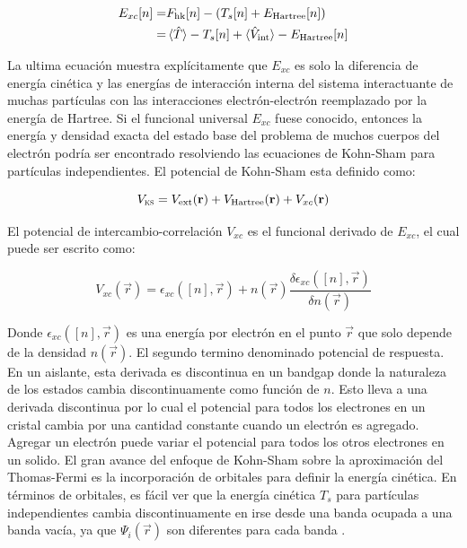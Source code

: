 \begin{equation}
    \begin{split}
        E_{xc}[n]=&F_{\text{hk}}[n]-(T_{s}[n]+E_{\text{Hartree}}[n])\\
        =&\braket{\hat{T}}-T_{s}[n]+\braket{\hat{V}_{\text{int}}}-E_{\text{Hartree}}[n]
    \end{split}
\end{equation}

La ultima ecuación muestra explícitamente que $E_{xc}$ es solo la diferencia de energía cinética y las energías de interacción interna del sistema interactuante de muchas partículas con las interacciones electrón-electrón reemplazado por la energía de Hartree. Si el funcional universal $E_{xc}$ fuese conocido, entonces la energía y densidad exacta del estado base del problema de muchos cuerpos del electrón podría ser encontrado resolviendo las ecuaciones de Kohn-Sham para partículas independientes. El potencial de Kohn-Sham esta definido como:

\begin{equation}
    V_{\textsc{ks}}=V_{\text{ext}}(\vec{r})+V_{\text{Hartree}}(\vec{r})+V_{xc}(\vec{r})
    \label{Eq. V_ks}
\end{equation}  

El potencial de intercambio-correlación $V_{xc}$ es el funcional derivado de $E_{xc}$, el cual puede ser escrito como:


\begin{equation}
    V_{xc}(\vec{r})=\epsilon_{xc}([n],\vec{r})+n(\vec{r})\frac{\delta\epsilon_{xc}([n],\vec{r})}{\delta n(\vec{r})}
    \label{Eq. V_xc}
\end{equation}

Donde $\epsilon_{xc}([n],\vec{r})$ es una energía por electrón en el punto $\vec{r}$ que solo depende de la densidad $n(\vec{r})$. El segundo termino denominado potencial de respuesta\cite{Gritsenko1994AnalysisPotentials}. En un aislante, esta derivada es discontinua en un bandgap donde la naturaleza de los estados cambia discontinuamente como función de $n$. Esto lleva a una derivada discontinua por lo cual el potencial para todos los electrones en un cristal cambia por una cantidad constante cuando un electrón es agregado\cite{Perdew1983PhysicalDiscontinuities,Sham1983Density-functionalGap}. Agregar un electrón puede variar el potencial para todos los otros electrones en un solido. El gran avance del enfoque de Kohn-Sham sobre la aproximación del Thomas-Fermi es la incorporación de orbitales para definir la energía cinética. En términos de orbitales, es fácil ver que la energía cinética $T_{s}$ para partículas independientes cambia discontinuamente en irse desde una banda ocupada a una banda vacía, ya que $\Psi_{i}(\vec{r})$ son diferentes para cada banda \cite{martin_2004}.

